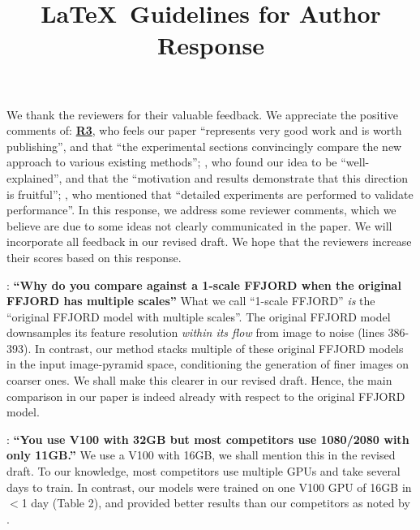 \documentclass[rebuttal]{cvpr}
\begin{document}
\title{\LaTeX\ Guidelines for Author Response}  

\thispagestyle{empty}





\newcommand{\ra}{\dotuline{\textcolor{r1color}{\textbf{R1}}}}
\newcommand{\rb}{\uwave{\textcolor{r2color}{\textbf{R2}}}}
\newcommand{\rc}{\uline{\textcolor{r3color}{\textbf{R3}}}}
\newcommand{\rd}{\dashuline{\textcolor{r4color}{\textbf{R4}}}}



We thank the reviewers for their valuable feedback. We appreciate the positive comments of: \rc{}, who feels our paper “represents very good work and is worth publishing”, and that “the experimental sections convincingly compare the new approach to various existing methods”; \rb{}, who found our idea to be “well-explained”, and that the “motivation and results demonstrate that this direction is fruitful”; \ra{}, who mentioned that “detailed experiments are performed to validate performance”. In this response, we address some reviewer comments, which we believe are due to some ideas not clearly communicated in the paper. We will incorporate all feedback in our revised draft. We hope that the reviewers increase their scores based on this response.

\rb : \textbf{“Why do you compare against a 1-scale FFJORD when the original FFJORD has multiple scales”}
What we call “1-scale FFJORD” \textit{is} the “original FFJORD model with multiple scales”. The original FFJORD model downsamples its feature resolution \textit{within its flow} from image to noise (lines 386-393). In contrast, our method stacks multiple of these original FFJORD models in the input image-pyramid space, conditioning the generation of finer images on coarser ones. We shall make this clearer in our revised draft. Hence, the main comparison in our paper is indeed already with respect to the original FFJORD model.

\rb : \textbf{“You use V100 with 32GB but most competitors use 1080/2080 with only 11GB.”}
We use a V100 with 16GB, we shall mention this in the revised draft. To our knowledge, most competitors use multiple GPUs and take several days to train. In contrast, our models were trained on one V100 GPU of 16GB in $<$1 day (Table 2), and provided better results than our competitors as noted by \rb{}.
\end{document}
